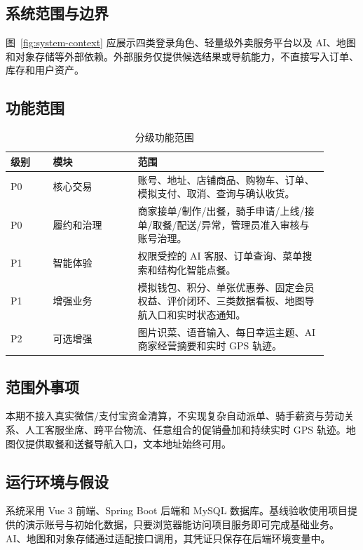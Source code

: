 \subsection{系统范围与边界}


图~\ref{fig:system-context} 应展示四类登录角色、轻量级外卖服务平台以及 AI、地图和对象存储等外部依赖。外部服务仅提供候选结果或导航能力，不直接写入订单、库存和用户资产。

\subsection{功能范围}

\begin{longtable}{|L{0.12\linewidth}|L{0.24\linewidth}|L{0.54\linewidth}|}
\caption{分级功能范围}\label{tab:scope}\\ \hline
\textbf{级别} & \textbf{模块} & \textbf{范围} \\ \hline
P0 & 核心交易 & 账号、地址、店铺商品、购物车、订单、模拟支付、取消、查询与确认收货。 \\ \hline
P0 & 履约和治理 & 商家接单/制作/出餐，骑手申请/上线/接单/取餐/配送/异常，管理员准入审核与账号治理。 \\ \hline
P1 & 智能体验 & 权限受控的 AI 客服、订单查询、菜单搜索和结构化智能点餐。 \\ \hline
P1 & 增强业务 & 模拟钱包、积分、单张优惠券、固定会员权益、评价闭环、三类数据看板、地图导航入口和实时状态通知。 \\ \hline
P2 & 可选增强 & 图片识菜、语音输入、每日幸运主题、AI 商家经营摘要和实时 GPS 轨迹。 \\ \hline
\end{longtable}

\subsection{范围外事项}

本期不接入真实微信/支付宝资金清算，不实现复杂自动派单、骑手薪资与劳动关系、人工客服坐席、跨平台物流、任意组合的促销叠加和持续实时 GPS 轨迹。地图仅提供取餐和送餐导航入口，文本地址始终可用。

\subsection{运行环境与假设}

系统采用 Vue 3 前端、Spring Boot 后端和 MySQL 数据库。基线验收使用项目提供的演示账号与初始化数据，只要浏览器能访问项目服务即可完成基础业务。AI、地图和对象存储通过适配接口调用，其凭证只保存在后端环境变量中。
